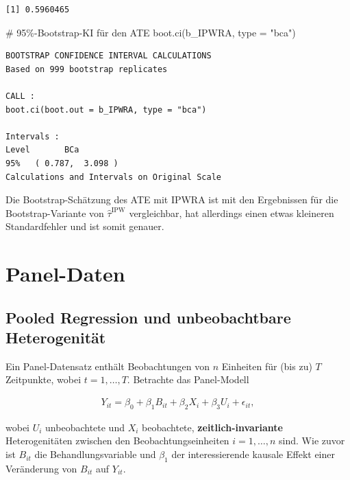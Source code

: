 \documentclass[
  a4paper,
  DIV=11,
  oneside]{scrreprt}
\newenvironment{Shaded}{\begin{snugshade}}{\end{snugshade}}
\newcommand{\AttributeTok}[1]{\textcolor[rgb]{0.40,0.45,0.13}{#1}}
\newcommand{\CommentTok}[1]{\textcolor[rgb]{0.37,0.37,0.37}{#1}}
\newcommand{\FunctionTok}[1]{\textcolor[rgb]{0.28,0.35,0.67}{#1}}
\newcommand{\NormalTok}[1]{\textcolor[rgb]{0.00,0.23,0.31}{#1}}
\newcommand{\StringTok}[1]{\textcolor[rgb]{0.13,0.47,0.30}{#1}}
\begin{document}
\begin{verbatim}
[1] 0.5960465
\end{verbatim}

\begin{Shaded}
\begin{Highlighting}[]
\CommentTok{\# 95\%{-}Bootstrap{-}KI für den ATE}
\FunctionTok{boot.ci}\NormalTok{(b\_IPWRA, }\AttributeTok{type =} \StringTok{"bca"}\NormalTok{)}
\end{Highlighting}
\end{Shaded}

\begin{verbatim}
BOOTSTRAP CONFIDENCE INTERVAL CALCULATIONS
Based on 999 bootstrap replicates

CALL : 
boot.ci(boot.out = b_IPWRA, type = "bca")

Intervals : 
Level       BCa          
95%   ( 0.787,  3.098 )  
Calculations and Intervals on Original Scale
\end{verbatim}

Die Bootstrap-Schätzung des ATE mit IPWRA ist mit den Ergebnissen für
die Bootstrap-Variante von \(\widehat{\tau}^\text{IPW}\) vergleichbar,
hat allerdings einen etwas kleineren Standardfehler und ist somit
genauer.


\chapter{Panel-Daten}\label{panel-daten}

\section{Pooled Regression und unbeobachtbare
Heterogenität}\label{sec-panel-uh}

Ein Panel-Datensatz enthält Beobachtungen von \(n\) Einheiten für (bis
zu) \(T\) Zeitpunkte, wobei \(t=1,\dots,T\). Betrachte das Panel-Modell

\begin{align}
  Y_{it} = \beta_0 + \beta_1 B_{it} + \beta_2 X_i + \beta_3 U_i + \epsilon_{it},\label{eq:unobshetmodel}
\end{align}

wobei \(U_i\) unbeobachtete und \(X_i\) beobachtete,
\textbf{zeitlich-invariante} Heterogenitäten zwischen den
Beobachtungseinheiten \(i=1,\dots,n\) sind. Wie zuvor ist \(B_{it}\) die
Behandlungsvariable und \(\beta_1\) der interessierende kausale Effekt
einer Veränderung von \(B_{it}\) auf \(Y_{it}\).
\end{document}
